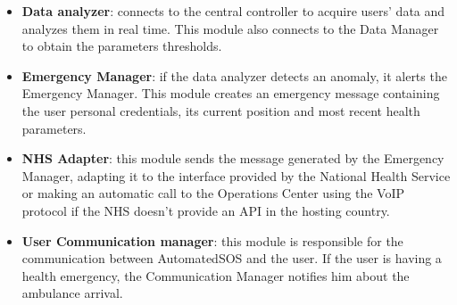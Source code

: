 \begin{itemize}
    \item \textbf{Data analyzer}: connects to the central controller to acquire users' data and analyzes them in real time. This module also connects to the Data Manager to obtain the parameters thresholds.
    \item \textbf{Emergency Manager}: if the data analyzer detects an anomaly, it alerts the Emergency Manager. This module creates an emergency message containing the user personal credentials, its current position and most recent health parameters.
    \item \textbf{NHS Adapter}: this module sends the message generated by the Emergency Manager, adapting it to the interface provided by the National Health Service or making an automatic call to the Operations Center using the VoIP protocol if the NHS doesn't provide an API in the hosting country.
    \item \textbf{User Communication manager}: this module is responsible for the communication between AutomatedSOS and the user. If the user is having a health emergency, the Communication Manager notifies him about the ambulance arrival.
\end{itemize}
\clearpage
